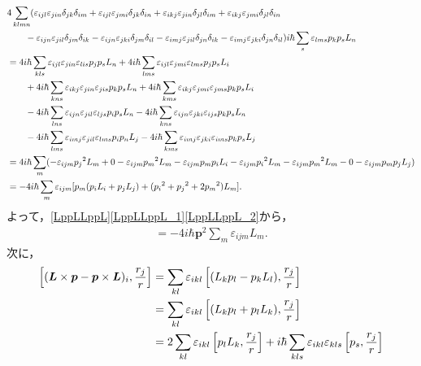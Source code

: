 \begin{align}
  & 4\sum_{klmn}(\varepsilon_{ijl}\varepsilon_{jin}\delta_{jk}\delta_{im} + \varepsilon_{ijl}\varepsilon_{jmi}\delta_{jk}\delta_{in} + \varepsilon_{ikj}\varepsilon_{jin}\delta_{jl}\delta_{im} + \varepsilon_{ikj}\varepsilon_{jmi}\delta_{jl}\delta_{in}\notag\\
  & \qquad - \varepsilon_{ijn}\varepsilon_{jil}\delta_{jm}\delta_{ik} - \varepsilon_{ijn}\varepsilon_{jki}\delta_{jm}\delta_{il} - \varepsilon_{imj}\varepsilon_{jil}\delta_{jn}\delta_{ik} - \varepsilon_{imj}\varepsilon_{jki}\delta_{jn}\delta_{il})i\hbar\sum_s\varepsilon_{lms}p_kp_sL_n\notag\\
  & = 4i\hbar\sum_{kls}\varepsilon_{ijl}\varepsilon_{jin}\varepsilon_{lis}p_jp_sL_n + 4i\hbar\sum_{lms}\varepsilon_{ijl}\varepsilon_{jmi}\varepsilon_{lms}p_jp_sL_i \\
  & \qquad + 4i\hbar\sum_{kns}\varepsilon_{ikj}\varepsilon_{jin}\varepsilon_{jis}p_kp_sL_n + 4i\hbar\sum_{kms}\varepsilon_{ikj}\varepsilon_{jmi}\varepsilon_{jms}p_kp_sL_i\notag\\
  & \qquad - 4i\hbar\sum_{lns}\varepsilon_{ijn}\varepsilon_{jil}\varepsilon_{ljs}p_ip_sL_n - 4i\hbar\sum_{kns}\varepsilon_{ijn}\varepsilon_{jki}\varepsilon_{ijs}p_kp_sL_n \\
  & \qquad- 4i\hbar\sum_{lms}\varepsilon_{imj}\varepsilon_{jil}\varepsilon_{lms}p_ip_nL_j - 4i\hbar\sum_{kms}\varepsilon_{imj}\varepsilon_{jki}\varepsilon_{ims}p_kp_sL_j\notag\\
  & = 4i\hbar\sum_m( - \varepsilon_{ijm}p_j{}^2L_m + 0 - \varepsilon_{ijm}p_m{}^2L_m - \varepsilon_{ijm}p_mp_iL_i - \varepsilon_{ijm}p_i{}^2L_m - \varepsilon_{ijm}p_m{}^2L_m - 0 - \varepsilon_{ijm}p_mp_jL_j)\notag\\
  & = - 4i\hbar\sum_m\varepsilon_{ijm}[p_m(p_iL_i + p_jL_j) + (p_i{}^2 + p_j{}^2 + 2p_m{}^2)L_m]\label{LppLLppL_2}.
\end{align}
よって，\eqref{LppLLppL}\eqref{LppLLppL_1}\eqref{LppLLppL_2}から，
\begin{align}
  [(\boldsymbol{L}\times\boldsymbol{p} - \boldsymbol{p}\times\boldsymbol{L})_i,(\boldsymbol{L}\times\boldsymbol{p} - \boldsymbol{p}\times\boldsymbol{L})_j]= - 4i\hbar\boldsymbol{p}^2\sum_m\varepsilon_{ijm}L_m.\label{LppLLppL_done}
\end{align}
次に，
\begin{align}
  \left[(\boldsymbol{L}\times\boldsymbol{p} - \boldsymbol{p}\times\boldsymbol{L})_i,\frac{r_j}{r}\right]
  & = \sum_{kl}\varepsilon_{ikl}\left[(L_kp_l - p_kL_l),\frac{r_j}{r}\right]\notag\\
  & = \sum_{kl}\varepsilon_{ikl}\left[(L_kp_l + p_lL_k),\frac{r_j}{r}\right]\notag\\
  & = 2\sum_{kl}\varepsilon_{ikl}\left[p_lL_k,\frac{r_j}{r}\right] + i\hbar\sum_{kls}\varepsilon_{ikl}\varepsilon_{kls}\left[p_s,\frac{r_j}{r}\right]\label{LppLr/r}
\end{align}
